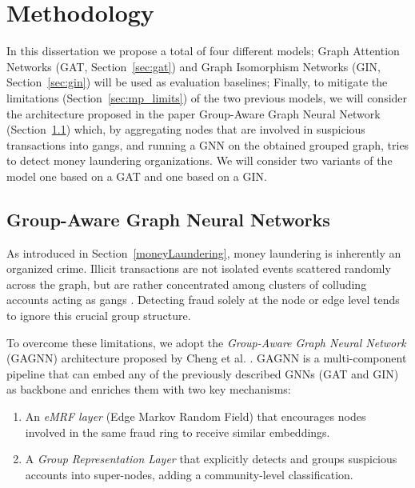 \chapter{Methodology}
\label{approaches}

In this dissertation we propose a total of four different models; Graph Attention Networks (GAT, Section~\ref{sec:gat}) and Graph Isomorphism Networks (GIN, Section~\ref{sec:gin}) will be used as evaluation baselines;
Finally, to mitigate the limitations (Section~\ref{sec:mp_limits}) of the two previous models, we will consider the architecture proposed in the paper Group-Aware Graph Neural Network ~\cite{mainpaper} (Section~\ref{sec:gagnn}) which, by aggregating nodes that are involved in suspicious transactions into gangs, and running a GNN on the obtained grouped graph, tries to detect money laundering organizations. 
We will consider two variants of the model one based on a GAT and one based on a GIN.

\section{Group-Aware Graph Neural Networks}
\label{sec:gagnn}

As introduced in Section~\ref{moneyLaundering}, money laundering is inherently an organized crime. Illicit transactions are not isolated events scattered randomly across the graph, but are rather concentrated among clusters of colluding accounts acting as gangs \cite{mainpaper}. Detecting fraud solely at the node or edge level tends to ignore this crucial group structure. 

To overcome these limitations, we adopt the \emph{Group-Aware Graph Neural Network} (GAGNN) architecture proposed by Cheng et al. \cite{mainpaper}. GAGNN is a multi-component pipeline that can embed any of the previously described GNNs (GAT and GIN) as backbone and enriches them with two key mechanisms:
\begin{enumerate}
  \item An \emph{eMRF layer} (Edge Markov Random Field) that encourages nodes involved in the same fraud ring to receive similar embeddings.
  \item A \emph{Group Representation Layer} that explicitly detects and groups suspicious accounts into super-nodes, adding a community-level classification.
\end{enumerate}


